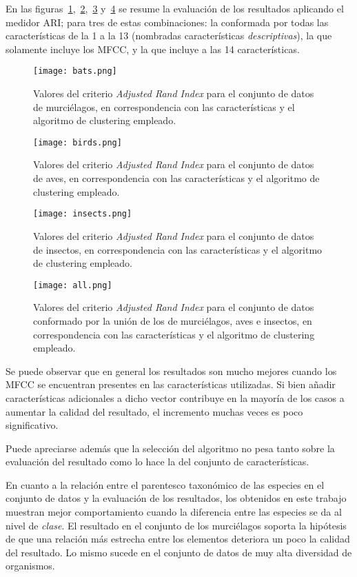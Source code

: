En las figuras~\ref{img:bats},~\ref{img:birds},~\ref{img:insects} y~\ref{img:all} se resume la evaluación de los resultados aplicando el medidor ARI;
para tres de estas combinaciones: la conformada por todas las características de la 1 a la 13 (nombradas características \textit{descriptivas}), la que solamente incluye los MFCC, y la que incluye a las 14 características.

\begin{figure}[!h]
    \centering
    \texttt{[image: bats.png]}
    \caption{Valores del criterio \textit{Adjusted Rand Index} para el conjunto de datos de murciélagos, en correspondencia con las características y el algoritmo de clustering empleado.}
    \label{img:bats}
\end{figure}

\begin{figure}[!h]
    \centering
    \texttt{[image: birds.png]}
    \caption{Valores del criterio \textit{Adjusted Rand Index} para el conjunto de datos de aves, en correspondencia con las características y el algoritmo de clustering empleado.}
    \label{img:birds}
\end{figure}

\begin{figure}[!h]
    \centering
    \texttt{[image: insects.png]}
    \caption{Valores del criterio \textit{Adjusted Rand Index} para el conjunto de datos de insectos, en correspondencia con las características y el algoritmo de clustering empleado.}
    \label{img:insects}
\end{figure}

\begin{figure}[!h]
    \centering
    \texttt{[image: all.png]}
    \caption{Valores del criterio \textit{Adjusted Rand Index} para el conjunto de datos conformado por la unión de los de murciélagos, aves e insectos, en correspondencia con las características y el algoritmo de clustering empleado.}
    \label{img:all}
\end{figure}

Se puede observar que en general los resultados son mucho mejores cuando los MFCC se encuentran presentes en las características utilizadas.
Si bien añadir características adicionales a dicho vector contribuye en la mayoría de los casos a aumentar la calidad del resultado, el incremento muchas veces es poco significativo.

Puede apreciarse además que la selección del algoritmo no pesa tanto sobre la evaluación del resultado como lo hace la del conjunto de características.

En cuanto a la relación entre el parentesco taxonómico de las especies en el conjunto de datos y la evaluación de los resultados,
los obtenidos en este trabajo muestran mejor comportamiento cuando la diferencia entre las especies se da al nivel de \textit{clase}.
El resultado en el conjunto de los murciélagos soporta la hipótesis de que una relación más estrecha entre los elementos deteriora un poco la calidad del resultado.
Lo mismo sucede en el conjunto de datos de muy alta diversidad de organismos.
